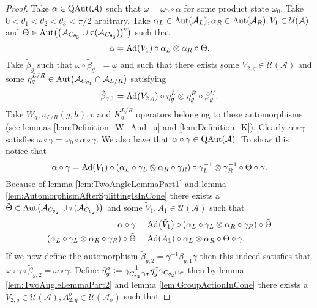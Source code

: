 \documentclass[12pt,a4paper,twoside]{article}
\newcommand{\defeq}{\vcentcolon=}
\let\originalleft\left
\let\originalright\right
\renewcommand{\left}{\mathopen{}\mathclose\bgroup\originalleft}
\renewcommand{\right}{\aftergroup\egroup\originalright}
\newcommand{\UU}{\mathcal U}
\renewcommand{\AA}{\mathcal A}
\newcommand{\Ad}[1]{\textrm{Ad}\left(#1\right)}
\newcommand{\Aut}[1]{\textrm{Aut}\left(#1\right)}
\newcommand{\QAut}[1]{\textrm{QAut}\left(#1\right)}
\theoremstyle{definition}
\numberwithin{equation}{section}
\begin{document}
\begin{proof}
	Take $\alpha\in\QAut{\AA}$ such that $\omega=\omega_0\circ\alpha$ for some product state $\omega_0$. Take $0<\theta_1<\theta_2<\theta_3<\pi/2$ arbitrary. Take $\alpha_L\in\Aut{\AA_L},\alpha_R\in\Aut{\AA_R},V_1\in\UU(\AA)$ and $\Theta\in\Aut{\left(\AA_{C_{\theta_3}} \cup \tau(\AA_{C_{\theta_3}})\right)^c}$ such that
	\begin{equation}
		\alpha=\Ad{V_1}\circ\alpha_L\otimes\alpha_R\circ\Theta.
	\end{equation}
	Take $\tilde{\beta}_g$ such that $\omega\circ\tilde{\beta}_{g,1}=\omega$ and such that there exists some $V_{2,g}\in\UU(\AA)$ and some $\eta_g^{L/R}\in\Aut{\AA_{C_{\theta_1}}\cap\AA_{L/R}}$ satisfying
	\begin{equation}
		\tilde{\beta}_{g,1}=\Ad{V_{2,g}}\circ\eta_{g}^L\otimes\eta_{g}^R\circ\beta_g^U.
	\end{equation}
	Take $W_g,u_{L/R}(g,h),v$ and $K_g^{L/R}$ operators belonging to these automorphisms (see lemmas \ref{lem:Definition_W_And_u} and \ref{lem:Definition_K}). Clearly $\alpha\circ\gamma$ satisfies $\omega\circ\gamma=\omega_0\circ\alpha\circ\gamma$. We also have that $\alpha\circ\gamma\in\QAut{\AA}$. To show this notice that
	\begin{equation}
		\alpha\circ\gamma=\Ad{V_1}\circ(\alpha_L\circ\gamma_{L}\otimes\alpha_R\circ\gamma_{R})\circ\gamma_{L}^{-1}\otimes\gamma_{R}^{-1}\circ\Theta\circ\gamma.
	\end{equation}
	Because of lemma \ref{lem:TwoAngleLemmaPart1} and lemma \ref{lem:AutomorphismAfterSplittingIsInCone} there exists a $\tilde{\Theta}\in\Aut{\AA_{C_{\theta_2}}\cup\tau(\AA_{C_{\theta_2}})}$ and some $\tilde V_1,A_1\in\UU(\AA)$ such that
	\begin{align}
		\alpha\circ\gamma&=\Ad{\tilde V_1}\circ(\alpha_L\circ\gamma_{L}\otimes\alpha_R\circ\gamma_{R})\circ\tilde\Theta\\
		(\alpha_L\circ\gamma_{L}\otimes\alpha_R\circ\gamma_{R})\circ\tilde\Theta&=\Ad{A_1}\circ \alpha_L\otimes\alpha_R\circ\Theta\circ\gamma.
	\end{align}
	If we now define the automorphism $\tilde{\beta}_{g,2}=\gamma^{-1}\beta_{g,1}\gamma$ then this indeed satisfies that $\omega\circ\gamma\circ\tilde{\beta}_{g,2}=\omega\circ\gamma$. Define $\tilde\eta_g^\sigma\defeq\gamma_{C_{\theta_2}\cap\sigma}^{-1}\eta_g^\sigma\gamma_{C_{\theta_2}\cap\sigma}$ then by lemma \ref{lem:TwoAngleLemmaPart2} and lemma \ref{lem:GroupActionInCone} there exists a $\tilde V_{2,g}\in\UU(\AA),A_{2,g}^{\sigma}\in\UU(\AA_\sigma)$ such that

\end{proof}
\end{document}
